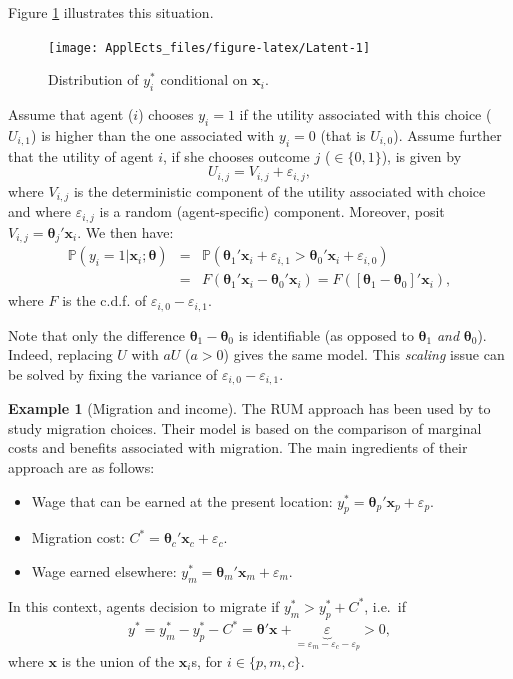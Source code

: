 \documentclass[
  12pt,
]{book}
\providecommand{\tightlist}{%
  \setlength{\itemsep}{0pt}\setlength{\parskip}{0pt}}
\theoremstyle{definition}
\theoremstyle{definition}
\newtheorem{example}{Example}[chapter]
\theoremstyle{definition}
\theoremstyle{definition}
\theoremstyle{remark}
\begin{document}
Figure \ref{fig:Latent} illustrates this situation.

\begin{figure}
\texttt{[image: ApplEcts\_files/figure-latex/Latent-1]} \caption{Distribution of $y_i^*$ conditional on $\mathbf{x}_i$.}\label{fig:Latent}
\end{figure}

Assume that agent (\(i\)) chooses \(y_i=1\) if the utility associated with this choice (\(U_{i,1}\)) is higher than the one associated with \(y_i=0\) (that is \(U_{i,0}\)). Assume further that the utility of agent \(i\), if she chooses outcome \(j\) (\(\in \{0,1\}\)), is given by
\[
U_{i,j} = V_{i,j} + \varepsilon_{i,j},
\]
where \(V_{i,j}\) is the deterministic component of the utility associated with choice and where \(\varepsilon_{i,j}\) is a random (agent-specific) component. Moreover, posit \(V_{i,j} = \boldsymbol\theta_j'\mathbf{x}_i\). We then have:
\begin{eqnarray}
\mathbb{P}(y_i = 1|\mathbf{x}_i;\boldsymbol\theta) &=& \mathbb{P}(\boldsymbol\theta_1'\mathbf{x}_i+\varepsilon_{i,1}>\boldsymbol\theta_0'\mathbf{x}_i+\varepsilon_{i,0}) \nonumber\\
&=& F(\boldsymbol\theta_1'\mathbf{x}_i-\boldsymbol\theta_0'\mathbf{x}_i) = F([\boldsymbol\theta_1-\boldsymbol\theta_0]'\mathbf{x}_i),\label{eq:utility}
\end{eqnarray}
where \(F\) is the c.d.f. of \(\varepsilon_{i,0}-\varepsilon_{i,1}\).

Note that only the difference \(\boldsymbol\theta_1-\boldsymbol\theta_0\) is identifiable (as opposed to \(\boldsymbol\theta_1\) \emph{and} \(\boldsymbol\theta_0\)). Indeed, replacing \(U\) with \(aU\) (\(a>0\)) gives the same model. This \emph{scaling} issue can be solved by fixing the variance of \(\varepsilon_{i,0}-\varepsilon_{i,1}\).

\begin{example}[Migration and income]
\protect\hypertarget{exm:migration}{}\label{exm:migration}The RUM approach has been used by \citet{Nakosteen_Zimmer_1980} to study migration choices. Their model is based on the comparison of marginal costs and benefits associated with migration. The main ingredients of their approach are as follows:

\begin{itemize}
\tightlist
\item
  Wage that can be earned at the present location: \(y_p^* = \boldsymbol\theta_p'\mathbf{x}_p + \varepsilon_p\).
\item
  Migration cost: \(C^*= \boldsymbol\theta_c'\mathbf{x}_c + \varepsilon_c\).
\item
  Wage earned elsewhere: \(y_m^* = \boldsymbol\theta_m'\mathbf{x}_m + \varepsilon_m\).
\end{itemize}

In this context, agents decision to migrate if \(y_m^* > y_p^* + C^*\), i.e.~if
\[
y^* = y_m^* -  y_p^* - C^* =  \boldsymbol\theta'\mathbf{x} + \underbrace{\varepsilon}_{=\varepsilon_m - \varepsilon_c - \varepsilon_p}>0,
\]
where \(\mathbf{x}\) is the union of the \(\mathbf{x}_i\)s, for \(i \in \{p,m,c\}\).
\end{example}
\end{document}
